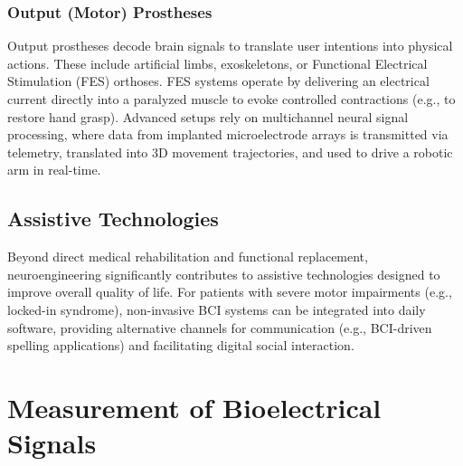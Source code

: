\documentclass[10pt, letterpaper]{report}
\begin{document}
\subsection{Output (Motor) Prostheses}
Output prostheses decode brain signals to translate user intentions into physical actions. These include artificial limbs, exoskeletons, or Functional Electrical Stimulation (FES) orthoses. FES systems operate by delivering an electrical current directly into a paralyzed muscle to evoke controlled contractions (e.g., to restore hand grasp).
Advanced setups rely on multichannel neural signal processing, where data from implanted microelectrode arrays is transmitted via telemetry, translated into 3D movement trajectories, and used to drive a robotic arm in real-time.

\section{Assistive Technologies}
Beyond direct medical rehabilitation and functional replacement, neuroengineering significantly contributes to assistive technologies designed to improve overall quality of life. For patients with severe motor impairments (e.g., locked-in syndrome), non-invasive BCI systems can be integrated into daily software, providing alternative channels for communication (e.g., BCI-driven spelling applications) and facilitating digital social interaction.

\chapter{Measurement of Bioelectrical Signals}
\end{document}
